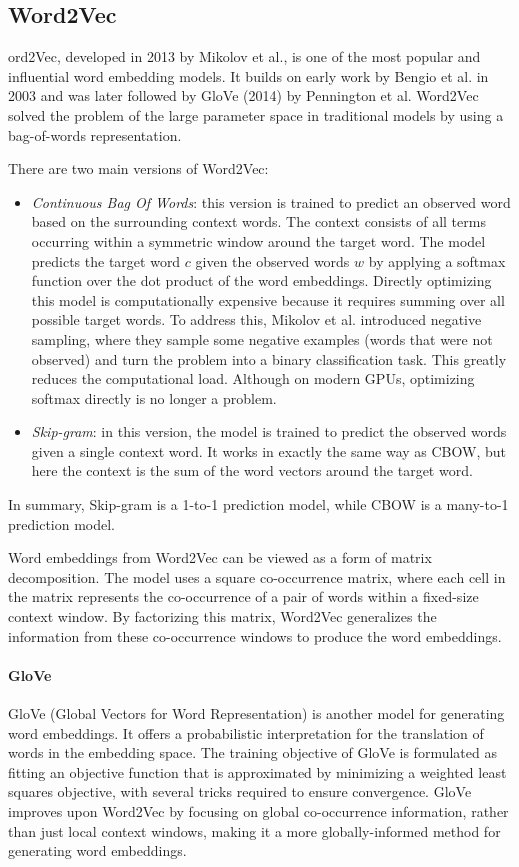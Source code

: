 \subsection{Word2Vec}
ord2Vec, developed in 2013 by Mikolov et al., is one of the most popular and influential word embedding models. 
It builds on early work by Bengio et al. in 2003 and was later followed by GloVe (2014) by Pennington et al. Word2Vec solved the problem of the large parameter space in traditional models by using a bag-of-words representation.

There are two main versions of Word2Vec:
\begin{itemize}
    \item \textit{Continuous Bag Of Words}: this version is trained to predict an observed word based on the surrounding context words. 
        The context consists of all terms occurring within a symmetric window around the target word. 
        The model predicts the target word $c$ given the observed words $w$ by applying a softmax function over the dot product of the word embeddings. 
        Directly optimizing this model is computationally expensive because it requires summing over all possible target words.
        To address this, Mikolov et al. introduced negative sampling, where they sample some negative examples (words that were not observed) and turn the problem into a binary classification task. 
        This greatly reduces the computational load. Although on modern GPUs, optimizing softmax directly is no longer a problem.
    \item \textit{Skip-gram}: in this version, the model is trained to predict the observed words given a single context word.
        It works in exactly the same way as CBOW, but here the context is the sum of the word vectors around the target word.
\end{itemize}
\noindent In summary, Skip-gram is a 1-to-1 prediction model, while CBOW is a many-to-1 prediction model.

Word embeddings from Word2Vec can be viewed as a form of matrix decomposition.
The model uses a square co-occurrence matrix, where each cell in the matrix represents the co-occurrence of a pair of words within a fixed-size context window. 
By factorizing this matrix, Word2Vec generalizes the information from these co-occurrence windows to produce the word embeddings.

\paragraph*{GloVe}
GloVe (Global Vectors for Word Representation) is another model for generating word embeddings. 
It offers a probabilistic interpretation for the translation of words in the embedding space. 
The training objective of GloVe is formulated as fitting an objective function that is approximated by minimizing a weighted least squares objective, with several tricks required to ensure convergence.
GloVe improves upon Word2Vec by focusing on global co-occurrence information, rather than just local context windows, making it a more globally-informed method for generating word embeddings.

